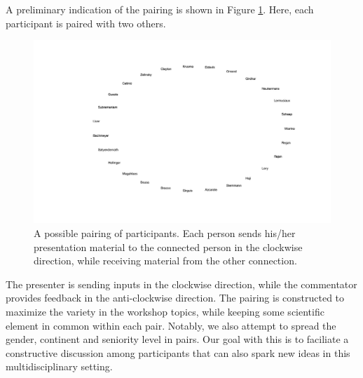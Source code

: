 A preliminary indication of the pairing is shown in Figure \ref{fig:pairs}. Here, each participant is paired with two others. 
\begin{figure}[htb]
  \centering 
  \includegraphics[scale=0.28]{fig/pair15march22.jpg}
  \caption{A possible pairing of participants. Each person sends his/her presentation material to the connected person in the clockwise direction, while receiving material from the other connection. }
  \label{fig:pairs}
\end{figure}
The presenter is sending inputs in the clockwise direction, while the commentator provides feedback in the anti-clockwise direction. 
The pairing is constructed to maximize the variety in the workshop topics, while keeping some scientific element in common within each pair. Notably, we also attempt to spread the gender, continent and seniority level in pairs. Our goal with this is to faciliate a constructive discussion among participants that can also spark new ideas in this multidisciplinary setting. 




